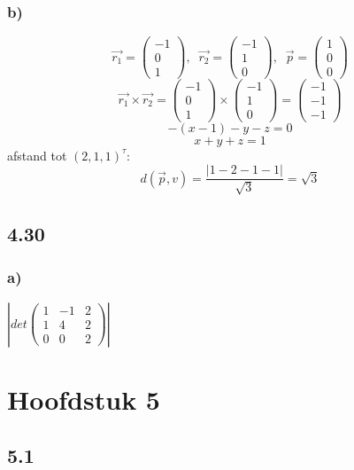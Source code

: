 \documentclass[11pt]{article}
\begin{document}
\subsubsection*{b)}
\[
\vec{r_1} = 
\begin{pmatrix}
-1\\0\\1
\end{pmatrix}
,\;\;
\vec{r_2} = 
\begin{pmatrix}
-1\\1\\0
\end{pmatrix}
,\;\;
\vec{p} = 
\begin{pmatrix}
1\\0\\0
\end{pmatrix}
\]
\[
\vec{r_1}\times\vec{r_2}=
\begin{pmatrix}
-1\\0\\1
\end{pmatrix}
\times
\begin{pmatrix}
-1\\1\\0
\end{pmatrix}
=
\begin{pmatrix}
-1\\-1\\-1
\end{pmatrix}
\]
\[-(x-1)-y-z=0\]
\[x+y+z=1\]
afstand tot $(2,1,1)^\tau$:\\
\[
d(\vec{p},v) = \frac{|1-2-1-1|}{\sqrt{3}} = \sqrt{3}
\]

\subsection*{4.30}
\subsubsection*{a)}
$\left\vert det\begin{pmatrix}
1 & -1 & 2 \\
1 & 4 & 2 \\
0 & 0 & 2
\end{pmatrix} \right\vert$

\section*{Hoofdstuk 5}
\subsection*{5.1}
\end{document}
